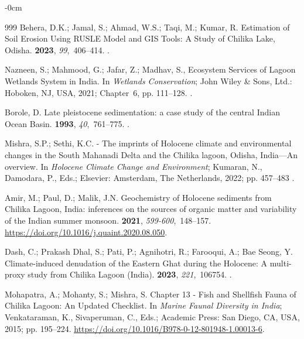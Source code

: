 \documentclass[jmse,article,accept,pdftex,oneauthor]{Definitions/mdpi}
\begin{document}
\begin{adjustwidth}{-\extralength}{0cm}
\begin{thebibliography}{999}
Behera, D.K.; Jamal, S.; Ahmad, W.S.; Taqi, M.; Kumar, R.
\newblock Estimation of Soil Erosion Using RUSLE Model and GIS Tools: A Study
  of Chilika Lake, Odisha.
 {\bf 2023}, {\em
  99},~406--414.
.

Nazneen, S.; Mahmood, G.; Jafar, Z.; Madhav, S., Ecosystem Services of Lagoon
  Wetlands System in India.
\newblock In {\em Wetlands Conservation}; John Wiley \& Sons, Ltd.:  {Hoboken, NJ, USA,} 
  2021; Chapter~6, pp. 111--128.
.

Borole, D.
\newblock Late pleistocene sedimentation: a case study of the central Indian
  Ocean Basin.
 {\bf
  1993}, {\em 40},~761--775.
.

Mishra, S.P.; Sethi, K.C.
 - The imprints of Holocene climate and environmental changes in
  the South Mahanadi Delta and the Chilika lagoon, Odisha, India—An overview.
  In {\em Holocene Climate Change and Environment}; Kumaran, N., Damodara, P.,
  Eds.; Elsevier:  {Amsterdam, The Netherlands,} 
  2022; pp. 457–483
.

Amir, M.; Paul, D.; Malik, J.N.
\newblock Geochemistry of Holocene sediments from Chilika Lagoon, India:
  inferences on the sources of organic matter and variability of the Indian
  summer monsoon.
 {\bf 2021}, {\em 599-600},~148--157.
 {\url{https://doi.org/10.1016/j.quaint.2020.08.050}}.

Dash, C.; {Prakash Dhal}, S.; Pati, P.; Agnihotri, R.; Farooqui, A.; {Bae
  Seong}, Y.
\newblock Climate-induced denudation of the Eastern Ghat during the Holocene: A
  multi-proxy study from Chilika Lagoon (India).
 {\bf 2023}, {\em 221},~106754.
.

Mohapatra, A.; Mohanty, S.; Mishra, S.
\newblock Chapter 13 - Fish and Shellfish Fauna of Chilika Lagoon: An Updated
  Checklist. In {\em Marine Faunal Diversity in India}; Venkataraman, K.,
  Sivaperuman, C., Eds.; Academic Press: San Diego, CA, USA, 2015; pp. 195--224.
\newblock
  {\url{https://doi.org/10.1016/B978-0-12-801948-1.00013-6}}.


\end{thebibliography}
\end{adjustwidth}
\end{document}
